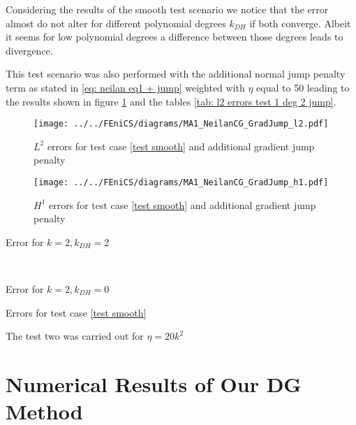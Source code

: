 Considering the results of the smooth test scenario we notice that the error almost do not alter for different polynomial degrees $k_{DH}$ if both converge. Albeit it seems for low polynomial degrees a difference between those degrees leads to divergence.

This test scenario was also performed with the additional normal jump penalty term as stated in \eqref{eq: neilan eq1 + jump} weighted with $\eta$ equal to 50 leading to the results shown in figure \ref{fig: l2 errors test 1 jump} and the tables \ref{tab: l2 errors test 1 deg 2 jump}.

\begin{figure}[h!]
	\texttt{[image: ../../FEniCS/diagrams/MA1\_NeilanCG\_GradJump\_l2.pdf]}
	\caption{$L^2$ errors for test case \ref{test smooth} and additional gradient jump penalty}
	\label{fig: l2 errors test 1 jump}
\end{figure}

\begin{figure}[h!]
	\texttt{[image: ../../FEniCS/diagrams/MA1\_NeilanCG\_GradJump\_h1.pdf]}
	\caption{$H^1$ errors for test case \ref{test smooth} and additional gradient jump penalty}
	\label{fig: h1 errors test 1 jump}
\end{figure}

\begin{table}[h]
	\begin{subtable}[b]{0.45\textwidth}
		\centering
		\pgfplotstabletypeset[columns={iterations, l2error, h1error,N}]\MAOneJumpdegTwoTwo
    	\caption{Error for $k=2, k_{DH}=2$}
   \end{subtable}
   ~
	\begin{subtable}[b]{0.45\textwidth}
		\centering
		\pgfplotstabletypeset[columns={iterations, l2error, h1error,N}]\MAOneJumpdegTwoZero
 	\caption{Error for $k=2, k_{DH}=0$}
	\end{subtable}
	\caption{Errors for test case \ref{test smooth}}
	\label{tab: l2 errors test 1 deg 2 jump}
\end{table}


The test two was carried out for $\eta=20k^2$


\newpage

\section{Numerical Results of Our DG Method}

